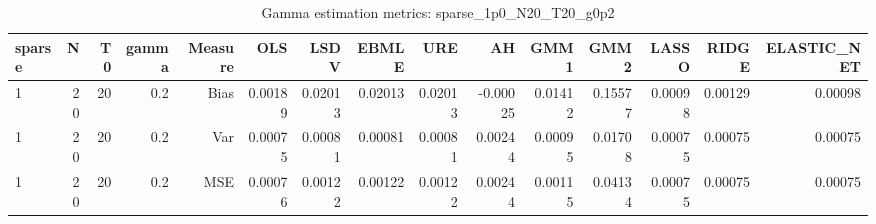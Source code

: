 \begin{table}[!htbp]\centering
\caption{Gamma estimation metrics: sparse_1p0_N20_T20_g0p2}
\label{tab:table1_sparse_1p0_N20_T20_g0p2}
\begin{tabular}{lrrrrrrrrrrrrrr}
\hline
sparse & N & T0 & gamma & Measure & OLS & LSDV & EBMLE & URE & AH & GMM1 & GMM2 & LASSO & RIDGE & ELASTIC_NET \\
\hline
1 & 20 & 20 & 0.2 & Bias & 0.00189 & 0.02013 & 0.02013 & 0.02013 & -0.00025 & 0.01412 & 0.15577 & 0.00098 & 0.00129 & 0.00098 \\
1 & 20 & 20 & 0.2 & Var & 0.00075 & 0.00081 & 0.00081 & 0.00081 & 0.00244 & 0.00095 & 0.01708 & 0.00075 & 0.00075 & 0.00075 \\
1 & 20 & 20 & 0.2 & MSE & 0.00076 & 0.00122 & 0.00122 & 0.00122 & 0.00244 & 0.00115 & 0.04134 & 0.00075 & 0.00075 & 0.00075 \\
\hline
\end{tabular}
\end{table}

